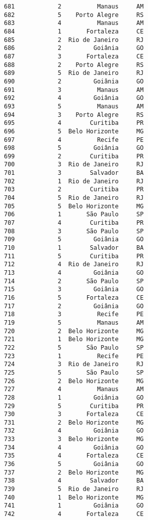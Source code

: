 \documentclass[11pt]{article}
\begin{document}
\begin{Verbatim}[commandchars=\\\{\}]
681            2          Manaus     AM  
682            5    Porto Alegre     RS  
683            4          Manaus     AM  
684            1       Fortaleza     CE  
685            2  Rio de Janeiro     RJ  
686            2         Goiânia     GO  
687            3       Fortaleza     CE  
688            2    Porto Alegre     RS  
689            5  Rio de Janeiro     RJ  
690            2         Goiânia     GO  
691            3          Manaus     AM  
692            4         Goiânia     GO  
693            5          Manaus     AM  
694            3    Porto Alegre     RS  
695            4        Curitiba     PR  
696            5  Belo Horizonte     MG  
697            4          Recife     PE  
698            5         Goiânia     GO  
699            2        Curitiba     PR  
700            3  Rio de Janeiro     RJ  
701            3        Salvador     BA  
702            1  Rio de Janeiro     RJ  
703            2        Curitiba     PR  
704            5  Rio de Janeiro     RJ  
705            5  Belo Horizonte     MG  
706            1       São Paulo     SP  
707            4        Curitiba     PR  
708            3       São Paulo     SP  
709            5         Goiânia     GO  
710            1        Salvador     BA  
711            5        Curitiba     PR  
712            4  Rio de Janeiro     RJ  
713            4         Goiânia     GO  
714            2       São Paulo     SP  
715            3         Goiânia     GO  
716            5       Fortaleza     CE  
717            2         Goiânia     GO  
718            3          Recife     PE  
719            5          Manaus     AM  
720            2  Belo Horizonte     MG  
721            1  Belo Horizonte     MG  
722            5       São Paulo     SP  
723            1          Recife     PE  
724            3  Rio de Janeiro     RJ  
725            5       São Paulo     SP  
726            2  Belo Horizonte     MG  
727            4          Manaus     AM  
728            1         Goiânia     GO  
729            5        Curitiba     PR  
730            3       Fortaleza     CE  
731            2  Belo Horizonte     MG  
732            4         Goiânia     GO  
733            3  Belo Horizonte     MG  
734            4         Goiânia     GO  
735            4       Fortaleza     CE  
736            5         Goiânia     GO  
737            2  Belo Horizonte     MG  
738            4        Salvador     BA  
739            5  Rio de Janeiro     RJ  
740            1  Belo Horizonte     MG  
741            1         Goiânia     GO  
742            4       Fortaleza     CE  

\end{Verbatim}
\end{document}
